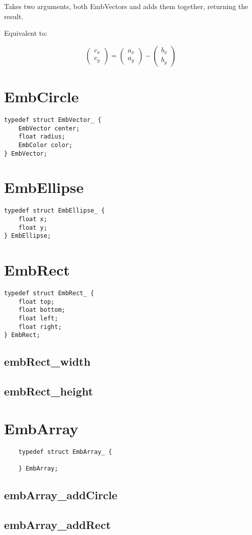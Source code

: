 Takes two arguments, both EmbVectors and adds them together, returning the result.

Equivalent to:

\begin{equation}
    \begin{pmatrix}
    c_x \\ c_y
    \end{pmatrix} =
    \begin{pmatrix}
    a_x \\ a_y
    \end{pmatrix} -
    \begin{pmatrix}
    b_x \\ b_y
    \end{pmatrix}
\end{equation}

\section{EmbCircle}

\begin{lstlisting}
typedef struct EmbVector_ {
    EmbVector center;
    float radius;
    EmbColor color;
} EmbVector;
\end{lstlisting}

\section{EmbEllipse}

\begin{lstlisting}
typedef struct EmbEllipse_ {
    float x;
    float y;
} EmbEllipse;
\end{lstlisting}

\section{EmbRect}

\begin{lstlisting}
typedef struct EmbRect_ {
    float top;
    float bottom;
    float left;
    float right;
} EmbRect;
\end{lstlisting}

\subsection{embRect\_width}

\subsection{embRect\_height}

\section{EmbArray}

\begin{lstlisting}
    typedef struct EmbArray_ {

    } EmbArray;
\end{lstlisting}

\subsection{embArray\_addCircle}

\subsection{embArray\_addRect}
